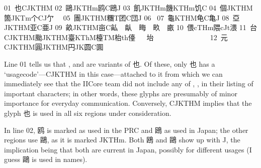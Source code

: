 \begin{multicols}{2}
\begingroup\mktsStyleCode{}01 {\cjk{}也}CJKTHM{} 
02 {\cjk{}鷗}JKTHm{\cjk{}{\cnsym{}　}鸥}C{\cjk{}{\cnsym{}　}鴎}J 
03 {\cjk{}飢}JKTHm{\cjk{}{\cnsym{}　}饑}KTHm{\cjk{}{\cnsym{}　}饥}C 
04 {\cjk{}個}JKTHM{\cjk{}{\cnsym{}　}箇}JKTm{\cjk{}{\cnsym{}　}个}CJ{\cjk{}{\cnsym{}　}亇{\cnsym{}　}} 
05 {\cjk{}團}JKTHM{\cjk{}{\cnsym{}　}糰}T{\cjk{}{\cnsym{}　}团}C{\cjk{}{\cnsym{}　}団}J{} 
06 {} 
07 {\cjk{}龜}KTHM{\cjk{}{\cnsym{}　}龟}C{\cjk{}{\cnsym{}　}亀}J{} 
{} 
08 {\cjk{}亞}JKTHM{\cjk{}{\cnsym{}　}亚}C{\cjk{}{\cnsym{}　}亜}J 
09 {\cjk{}畝}JKTHM{\cjk{}{\cnsym{}　}亩}C{\cjk{}{\cnsym{}　}畆{\cnsym{}　}畒{\cnsym{}　}畮{\cnsym{}　}畂{\cnsym{}　}畞} 
10 {\cjk{}偎}cTHm{\cjk{}{\cnsym{}　}隈}cJt{\cjk{}{\cnsym{}　}渨} 
11 {\cjk{}台}CJKTHM{\cjk{}{\cnsym{}　}颱}JKTHM{\cjk{}{\cnsym{}　}臺}KThM{\cjk{}{\cnsym{}　}檯}TM{\cjk{}{\cnsym{}　}枱}th{\cjk{}{\cnsym{}　}儓{\cnsym{}　}{\cnxb{}𡌫}} 
{坮{\cnsym{}　}{\cnxb{}𡋛}{\cnsym{}　}{\cnxb{}𡌬}{\cnsym{}　}{\cnxb{}𡎲}{\cnsym{}　}{\cnxb{}𡐉}{\cnsym{}　}{\cnxb{}𡔼}{\cnsym{}　}{\cnxb{}𦤼}} 
12 {\cjk{}元}CJKTHM{\cjk{}{\cnsym{}　}圓}JKTHM{\cjk{}{\cnsym{}　}円}JK{\cjk{}{\cnsym{}　}圆}C{\cjk{}{\cnsym{}　}圎} 
\endgroup{}{}

\endgroup{}Line {\mktsStyleCode{}01} tells us that {}, { }and { }are variants of {\cjk{}也}. Of
these, only {\cjk{}也} has a ‘usagecode’—{\mktsStyleCode{}CJKTHM} in this case—attached to it
from which we can immediately see that the IICore team did not
include any of {}, {}, { }in their listing of important characters;
in other words, these glyphs are presumably of minor importance
for everyday communication. Conversely, {\mktsStyleCode{}CJKTHM} implies that the glyph {\cjk{}也}
is used in all six regions under consideration.\mktsShowpar\par
In line {\mktsStyleCode{}02}, {\cjk{}鸥} is marked as used in the PRC and {\cjk{}鴎} as used in Japan;
the other regions use {\cjk{}鷗}, as it is marked {\mktsStyleCode{}JKTHm}. Both
{\cjk{}鴎} and {\cjk{}鷗} show up with {\mktsStyleCode{}J}, the implication being that both are
current in Japan, possibly for different usages (I guess {\cjk{}鷗} is used in names).\mktsShowpar\par
\end{multicols}\null\newpage{}\begin{multicols}{2}\end{multicols}
